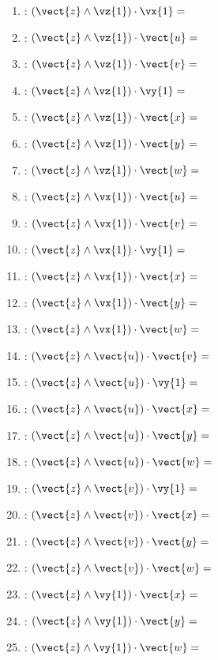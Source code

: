 \begin{multicols}{2}
\begin{enumerate}
\item : $\left(\vect{z}\wedge\vz{1}\right)\cdot\vx{1} = $
\item : $\left(\vect{z}\wedge\vz{1}\right)\cdot\vect{u} = $
\item : $\left(\vect{z}\wedge\vz{1}\right)\cdot\vect{v} = $
\item : $\left(\vect{z}\wedge\vz{1}\right)\cdot\vy{1} = $
\item : $\left(\vect{z}\wedge\vz{1}\right)\cdot\vect{x} = $
\item : $\left(\vect{z}\wedge\vz{1}\right)\cdot\vect{y} = $
\item : $\left(\vect{z}\wedge\vz{1}\right)\cdot\vect{w} = $
\item : $\left(\vect{z}\wedge\vx{1}\right)\cdot\vect{u} = $
\item : $\left(\vect{z}\wedge\vx{1}\right)\cdot\vect{v} = $
\item : $\left(\vect{z}\wedge\vx{1}\right)\cdot\vy{1} = $
\item : $\left(\vect{z}\wedge\vx{1}\right)\cdot\vect{x} = $
\item : $\left(\vect{z}\wedge\vx{1}\right)\cdot\vect{y} = $
\item : $\left(\vect{z}\wedge\vx{1}\right)\cdot\vect{w} = $
\item : $\left(\vect{z}\wedge\vect{u}\right)\cdot\vect{v} = $
\item : $\left(\vect{z}\wedge\vect{u}\right)\cdot\vy{1} = $
\item : $\left(\vect{z}\wedge\vect{u}\right)\cdot\vect{x} = $
\item : $\left(\vect{z}\wedge\vect{u}\right)\cdot\vect{y} = $
\item : $\left(\vect{z}\wedge\vect{u}\right)\cdot\vect{w} = $
\item : $\left(\vect{z}\wedge\vect{v}\right)\cdot\vy{1} = $
\item : $\left(\vect{z}\wedge\vect{v}\right)\cdot\vect{x} = $
\item : $\left(\vect{z}\wedge\vect{v}\right)\cdot\vect{y} = $
\item : $\left(\vect{z}\wedge\vect{v}\right)\cdot\vect{w} = $
\item : $\left(\vect{z}\wedge\vy{1}\right)\cdot\vect{x} = $
\item : $\left(\vect{z}\wedge\vy{1}\right)\cdot\vect{y} = $
\item : $\left(\vect{z}\wedge\vy{1}\right)\cdot\vect{w} = $

\end{enumerate}
\end{multicols}
